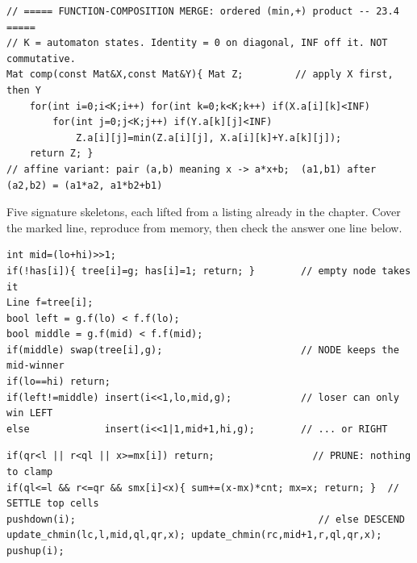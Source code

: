 \begin{lstlisting}[caption={Chapter 23 kit: the Li Chao container, the beats chmin node, the Chtholly split, and the (min,+) matrix composition, one compact skeleton each, in one place}, label={lst:c29-kit}]
// ===== FUNCTION-COMPOSITION MERGE: ordered (min,+) product -- 23.4 =====
// K = automaton states. Identity = 0 on diagonal, INF off it. NOT commutative.
Mat comp(const Mat&X,const Mat&Y){ Mat Z;         // apply X first, then Y
    for(int i=0;i<K;i++) for(int k=0;k<K;k++) if(X.a[i][k]<INF)
        for(int j=0;j<K;j++) if(Y.a[k][j]<INF)
            Z.a[i][j]=min(Z.a[i][j], X.a[i][k]+Y.a[k][j]);
    return Z; }
// affine variant: pair (a,b) meaning x -> a*x+b;  (a1,b1) after (a2,b2) = (a1*a2, a1*b2+b1)
\end{lstlisting}


Five signature skeletons, each lifted from a listing already in the chapter. Cover the marked line,
reproduce from memory, then check the answer one line below.

\begin{lstlisting}[caption={Drill 1 -- the Li Chao insert: keep the mid-winner, send the loser to one side (from lst:c29-lichao)}]
int mid=(lo+hi)>>1;
if(!has[i]){ tree[i]=g; has[i]=1; return; }        // empty node takes it
Line f=tree[i];
bool left = g.f(lo) < f.f(lo);
bool middle = g.f(mid) < f.f(mid);
if(middle) swap(tree[i],g);                        // NODE keeps the mid-winner
if(lo==hi) return;
if(left!=middle) insert(i<<1,lo,mid,g);            // loser can only win LEFT
else             insert(i<<1|1,mid+1,hi,g);        // ... or RIGHT
\end{lstlisting}

\begin{lstlisting}[caption={Drill 2 -- beats chmin: prune, settle, or descend; push before descending (from lst:c29-beats)}]
if(qr<l || r<ql || x>=mx[i]) return;                 // PRUNE: nothing to clamp
if(ql<=l && r<=qr && smx[i]<x){ sum+=(x-mx)*cnt; mx=x; return; }  // SETTLE top cells
pushdown(i);                                          // else DESCEND
update_chmin(lc,l,mid,ql,qr,x); update_chmin(rc,mid+1,r,ql,qr,x); pushup(i);
\end{lstlisting}

